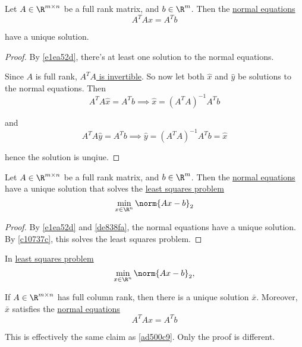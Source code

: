 \label{de838fa}

Let $A\in\R^{m\times n}$ be a full rank matrix, and $b\in\R^m$. Then the
\href{b17beaa}{normal equations}
$$
  A^TAx=A^Tb
$$

have a unique solution.

\begin{proof}
  By \autoref{e1ea52d}, there's at least one solution to the normal equations.

  Since $A$ is full rank, \href{d4f72eb}{$A^TA$ is invertible}. So now let both
  $\hat x$ and $\hat y$ be solutions to the normal equations. Then
  $$
    A^TA\hat x=A^Tb\implies\hat x=(A^TA)^{-1}A^Tb
  $$

  and
  $$
    A^TA\hat y=A^Tb\implies\hat y=(A^TA)^{-1}A^Tb=\hat x
  $$

  hence the solution is unqiue.
\end{proof}

\label{ad500c9}

Let $A\in\R^{m\times n}$ be a full rank matrix, and $b\in\R^m$. Then the
\href{b17beaa}{normal equations} have a unique solution that solves the
\href{c5a0d84}{least squares problem}
$$
  \min_{x\in\R^n}\norm{Ax-b}_2
$$

\begin{proof}
  By \autoref{e1ea52d} and \autoref{de838fa}, the normal equations have a unique
  solution. By \autoref{c10737c}, this solves the least squares problem.
\end{proof}

\label{d2262b9}

In \href{c5a0d84}{least squares problem}
$$
  \min_{x\in\R^n}\norm{Ax-b}_2,
$$

If $A\in\R^{m\times n}$ has full column rank, then there is a unique solution
$\bar x$. Moreover, $\bar x$ satisfies the \href{b17beaa}{normal equations}
$$
  A^TAx=A^Tb
$$

This is effectively the same claim as \autoref{ad500c9}. Only the proof is
different.

